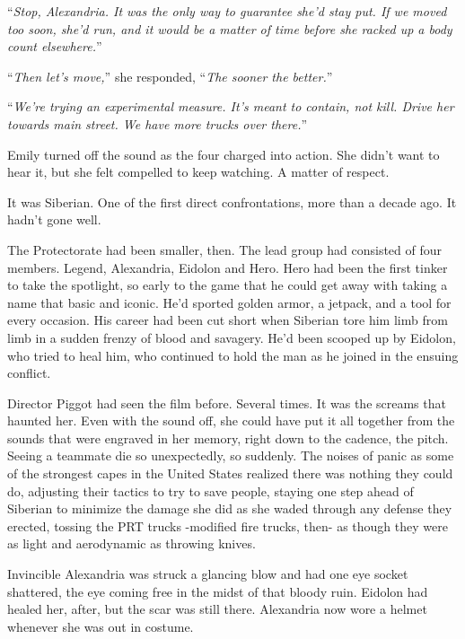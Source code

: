 ``\emph{Stop, Alexandria.  It was the only way to guarantee she'd stay put.  If we moved too soon, she'd run, and it would be a matter of time before she racked up a body count elsewhere.}''



``\emph{Then let's move,}'' she responded, ``\emph{The sooner the better.}''



``\emph{We're trying an experimental measure.  It's meant to contain, not kill.  Drive her towards main street.  We have more trucks over there.}''



Emily turned off the sound as the four charged into action.  She didn't want to hear it, but she felt compelled to keep watching.  A matter of respect.



It was Siberian.  One of the first direct confrontations, more than a decade ago.  It hadn't gone well.



The Protectorate had been smaller, then.  The lead group had consisted of four members.  Legend, Alexandria, Eidolon and Hero.  Hero had been the first tinker to take the spotlight, so early to the game that he could get away with taking a name that basic and iconic.  He'd sported golden armor, a jetpack, and a tool for every occasion.  His career had been cut short when Siberian tore him limb from limb in a sudden frenzy of blood and savagery.  He'd been scooped up by Eidolon, who tried to heal him, who continued to hold the man as he joined in the ensuing conflict.



Director Piggot had seen the film before.  Several times.  It was the screams that haunted her.  Even with the sound off, she could have put it all together from the sounds that were engraved in her memory, right down to the cadence, the pitch.  Seeing a teammate die so unexpectedly, so suddenly.  The noises of panic as some of the strongest capes in the United States realized there was nothing they could do, adjusting their tactics to try to save people, staying one step ahead of Siberian to minimize the damage she did as she waded through any defense they erected, tossing the PRT trucks -modified fire trucks, then- as though they were as light and aerodynamic as throwing knives.



Invincible Alexandria was struck a glancing blow and had one eye socket shattered, the eye coming free in the midst of that bloody ruin.  Eidolon had healed her, after, but the scar was still there.  Alexandria now wore a helmet whenever she was out in costume.



